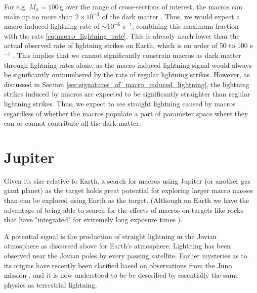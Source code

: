 \documentclass[%
reprint,
 amsmath,amssymb,
 aps,
 prd,
]{revtex4-2}
\begin{document}
        For e.g. $M_x = 100\,$g over the range of cross-sections of interest, the macros can make up no more than $2\times 10^{-3}$ of the dark matter \cite{Sidhu2019death}. Thus, we would expect a macro-induced lightning rate of $\sim 10^{-6}$ s$^{-1}$, combining this maximum fraction with the rate \eqref{eq:macro_lightning_rate}. This is already much lower than the actual observed rate of lightning strikes on Earth, which is on order of 50 to $100$ s$^{-1}$ \citep{Mackerras1998}. This implies that we cannot significantly constrain macros as dark matter through lightning rates alone, as the macro-induced lightning signal would always be significantly outnumbered by the rate of regular lightning strikes. However, as discussed in Section \ref{sec:signatures_of_macro_induced_lightning}, the lightning strikes induced by macros are expected to be significantly straighter than regular lightning strikes. Thus, we expect to see straight lightning caused by macros regardless of whether the macros populate a part of parameter space where they can or cannot contribute all the dark matter.

    


\section{Jupiter} %
\label{sec:jovian_bolides}

    Given its size relative to Earth, a search for macros using Jupiter (or another gas giant planet) as the target  holds great potential for  exploring larger macro masses than can be explored using Earth as the target.  (Although on Earth we have the advantage of being able to search for the effects of macros on targets like rocks that have "integrated" for extremely long exposure times \cite{Sidhu2019granite}). 

    A potential signal is the production of straight lightning in the Jovian atmosphere as discussed above for Earth's atmosphere. Lightning has been observed near the Jovian poles by every passing satellite. Earlier mysteries as to its origins have recently been clarified based on observations from the Juno mission \cite{Brown2018}, and it is now understood to be be described by essentially the same physics as terrestrial lightning.
\end{document}

